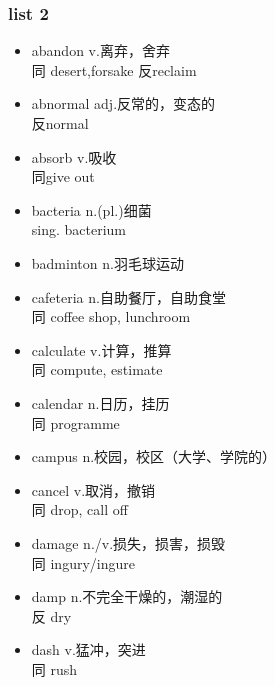 \documentclass[11pt,a4paper,UTF8,titlepage]{ctexart} %
\begin{document}
    \subsubsection{list 2}
    \begin{multicols}{2}
        \begin{itemize}[left=0em]
            \item abandon v.离弃，舍弃\\同 desert,forsake 反reclaim
            \item abnormal adj.反常的，变态的\\反normal
            \item absorb v.吸收\\同give out
            \item bacteria n.(pl.)细菌\\sing. bacterium
            \item badminton n.羽毛球运动
            \item cafeteria n.自助餐厅，自助食堂\\同 coffee shop, lunchroom
            \item calculate v.计算，推算\\同 compute, estimate
            \item calendar n.日历，挂历\\同 programme
            \item campus n.校园，校区（大学、学院的）
            \item cancel v.取消，撤销\\同 drop, call off
            \item damage n./v.损失，损害，损毁\\同 ingury/ingure
            \item damp n.不完全干燥的，潮湿的\\反 dry
            \item dash v.猛冲，突进\\同 rush
        \end{itemize}
    \end{multicols}

    \ifx\collections\undefined
    \printbibliography %
    \printindex %
\end{document}
